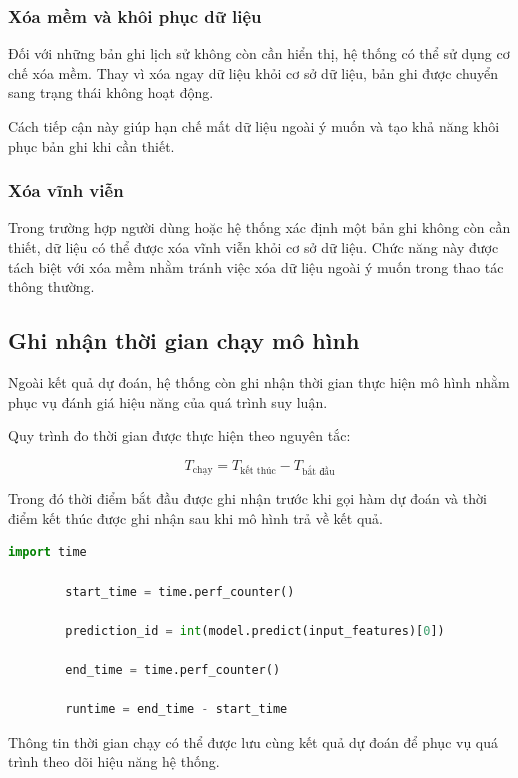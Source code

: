 \documentclass[14pt]{extarticle}
\begin{document}
	
	\subsubsection{Xóa mềm và khôi phục dữ liệu}
	
	\noindent Đối với những bản ghi lịch sử không còn cần hiển thị, hệ thống có thể sử dụng cơ chế xóa mềm. Thay vì xóa ngay dữ liệu khỏi cơ sở dữ liệu, bản ghi được chuyển sang trạng thái không hoạt động.
	
	\noindent Cách tiếp cận này giúp hạn chế mất dữ liệu ngoài ý muốn và tạo khả năng khôi phục bản ghi khi cần thiết.
	
	\subsubsection{Xóa vĩnh viễn}
	
	\noindent Trong trường hợp người dùng hoặc hệ thống xác định một bản ghi không còn cần thiết, dữ liệu có thể được xóa vĩnh viễn khỏi cơ sở dữ liệu. Chức năng này được tách biệt với xóa mềm nhằm tránh việc xóa dữ liệu ngoài ý muốn trong thao tác thông thường.
	
	\subsection{Ghi nhận thời gian chạy mô hình}
	
	\noindent Ngoài kết quả dự đoán, hệ thống còn ghi nhận thời gian thực hiện mô hình nhằm phục vụ đánh giá hiệu năng của quá trình suy luận.
	
	\noindent Quy trình đo thời gian được thực hiện theo nguyên tắc:
	
	$$
	T_{\text{chạy}} =
	T_{\text{kết thúc}} -
	T_{\text{bắt đầu}}
	$$
	
	\noindent Trong đó thời điểm bắt đầu được ghi nhận trước khi gọi hàm dự đoán và thời điểm kết thúc được ghi nhận sau khi mô hình trả về kết quả.
	
	\begin{lstlisting}[language=Python, numbers=none]
		import time
		
		start_time = time.perf_counter()
		
		prediction_id = int(model.predict(input_features)[0])
		
		end_time = time.perf_counter()
		
		runtime = end_time - start_time
	\end{lstlisting}
	
	\noindent Thông tin thời gian chạy có thể được lưu cùng kết quả dự đoán để phục vụ quá trình theo dõi hiệu năng hệ thống.
	
\end{document}
